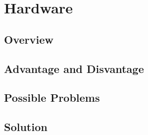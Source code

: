 \section{Hardware} 
\subsection{Overview}
\subsection{Advantage and Disvantage}
\subsection{Possible Problems}
\subsection{Solution}
\pagebreak